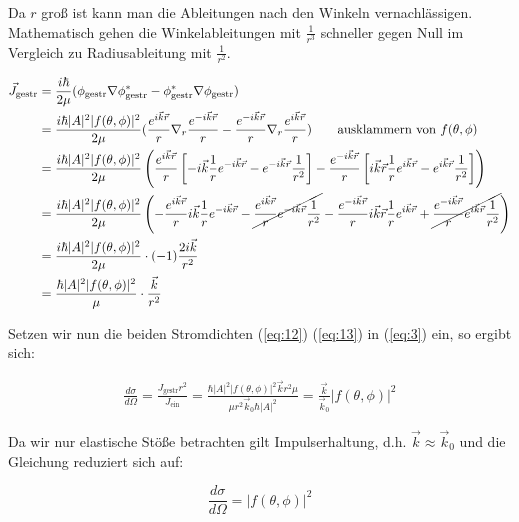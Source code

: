 Da \(r\) groß ist kann man die Ableitungen nach den Winkeln vernachlässigen. Mathematisch gehen die Winkelableitungen mit \(\frac{1}{r^3}\) schneller gegen Null im Vergleich zu Radiusableitung mit \(\frac{1}{r^2}\).

\begin{align}
  \label{eq:13}
 \vec J_{\text{gestr}} &= \frac{i\hbar}{2\mu} (\phi_{\text{gestr}} \nabla \phi^*_{\text{gestr}} - \phi^*_{\text{gestr}}\nabla\phi_{\text{gestr}})\notag\\
&= \frac{i\hbar |A|^2 |f(\theta,\phi)|^2 }{2\mu} ( \frac{e^{i\vec k\vec r}}{r}  \nabla_r \frac{e^{-i\vec k\vec r}}{r}  - \frac{e^{-i\vec k\vec r}}{r} \nabla_r \frac{e^{i\vec k\vec r}}{r}  ) \qquad \text{ausklammern von }f(\theta,\phi)\text{ } \notag \\
&= \frac{i\hbar |A|^2 |f(\theta,\phi)|^2 }{2\mu} \left( \frac{e^{i\vec k\vec r}}{r} \left[-i\vec k \frac{1}{r}  e^{-i\vec k\vec r}- e^{-i\vec k\vec r}\frac{1}{r^2}\right]  - \frac{e^{-i\vec k\vec r}}{r} \left[ i\vec k\vec r \frac{1}{r} e^{i\vec k\vec r} -  e^{i\vec k\vec r}\frac{1}{r^2}\right]  \right)\notag\\
&= \frac{i\hbar |A|^2 |f(\theta,\phi)|^2 }{2\mu} \left(- \frac{e^{i\vec k\vec r}}{r} i\vec k \frac{1}{r}  e^{-i\vec k\vec r}-\cancel{ \frac{e^{i\vec k\vec r}}{r} e^{-i\vec k\vec r}\frac{1}{r^2}}  - \frac{e^{-i\vec k\vec r}}{r} i\vec k\vec r \frac{1}{r} e^{i\vec k\vec r} + \cancel{\frac{e^{-i\vec k\vec r}}{r} e^{i\vec k\vec r}\frac{1}{r^2}}  \right)\notag\\
&= \frac{i\hbar |A|^2 |f(\theta,\phi)|^2 }{2\mu} \cdot (-1)\frac{ 2i\vec k }{r^2} \notag\\
&= \frac{\hbar |A|^2 |f(\theta,\phi)|^2 }{\mu} \cdot\frac{\vec k }{r^2}
\end{align}


Setzen wir nun die beiden Stromdichten (\ref{eq:12}) (\ref{eq:13}) in  (\ref{eq:3}) ein, so ergibt sich:

\begin{align}
  \label{eq:14}
   \frac{d\sigma}{d\Omega} = \frac{ J_{\text{gestr}}r^2 }{J_{\text{ein}}} = \frac{\hbar |A|^2 |f(\theta,\phi)|^2 \vec k r^2\mu }{\mu r^2 \vec k_{0}\hbar|A|^2 } = \frac{  \vec k }{ \vec k_{0} }|f(\theta,\phi)|^2 
\end{align}

Da wir nur elastische Stöße betrachten gilt Impulserhaltung, d.h. \(\vec k\approx\vec k_0\) und die Gleichung reduziert sich auf:

\begin{equation}
  \label{eq:15}
\boxed{  \frac{d\sigma}{d\Omega}= |f(\theta,\phi)|^2 }
\end{equation}

